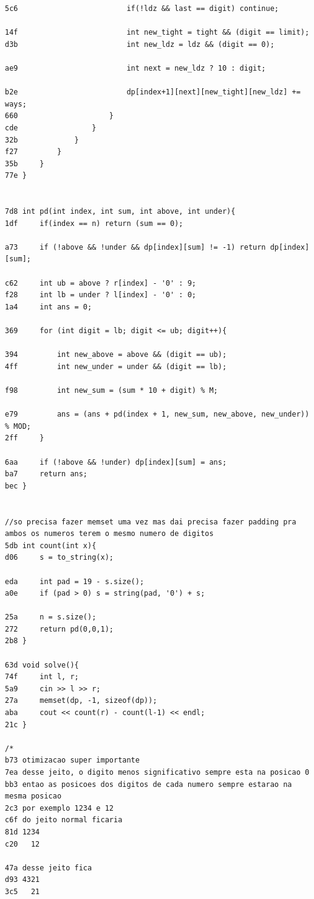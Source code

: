 \documentclass[11pt, a4paper, twoside]{article}
\begin{document}
{{\begin{lstlisting}
5c6                         if(!ldz && last == digit) continue;
    
14f                         int new_tight = tight && (digit == limit);
d3b                         int new_ldz = ldz && (digit == 0);
                            
ae9                         int next = new_ldz ? 10 : digit;
    
b2e                         dp[index+1][next][new_tight][new_ldz] += ways;
660                     }
cde                 }
32b             }
f27         }
35b     }
77e }


7d8 int pd(int index, int sum, int above, int under){
1df     if(index == n) return (sum == 0);
    
a73     if (!above && !under && dp[index][sum] != -1) return dp[index][sum];
    
c62     int ub = above ? r[index] - '0' : 9;
f28     int lb = under ? l[index] - '0' : 0;
1a4     int ans = 0;
    
369     for (int digit = lb; digit <= ub; digit++){
    
394         int new_above = above && (digit == ub);
4ff         int new_under = under && (digit == lb);
            
f98         int new_sum = (sum * 10 + digit) % M;
            
e79         ans = (ans + pd(index + 1, new_sum, new_above, new_under)) % MOD;
2ff     }
        
6aa     if (!above && !under) dp[index][sum] = ans; 
ba7     return ans;
bec }


//so precisa fazer memset uma vez mas dai precisa fazer padding pra ambos os numeros terem o mesmo numero de digitos
5db int count(int x){
d06     s = to_string(x);
        
eda     int pad = 19 - s.size();
a0e     if (pad > 0) s = string(pad, '0') + s;
        
25a     n = s.size();
272     return pd(0,0,1);
2b8 }

63d void solve(){
74f     int l, r;
5a9     cin >> l >> r;
27a     memset(dp, -1, sizeof(dp));
aba     cout << count(r) - count(l-1) << endl;
21c }

/*
b73 otimizacao super importante
7ea desse jeito, o digito menos significativo sempre esta na posicao 0
bb3 entao as posicoes dos digitos de cada numero sempre estarao na mesma posicao
2c3 por exemplo 1234 e 12
c6f do jeito normal ficaria 
81d 1234
c20   12

47a desse jeito fica
d93 4321
3c5   21


\end{lstlisting}}}
\end{document}
